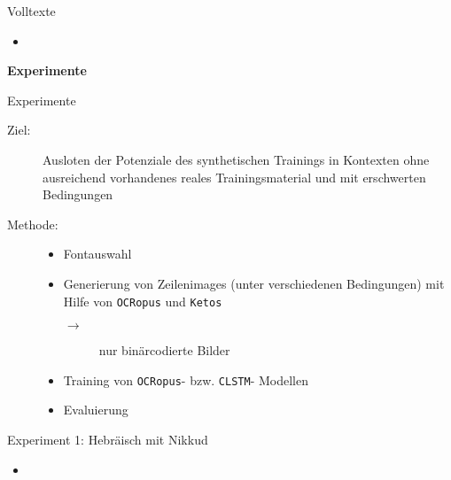 \documentclass{bbawslides}
\begin{document}
\begin{bbawslide}{Volltexte}
  \vspace*{7mm}%
  \centerslidestrue%
  \begin{itemize}
    \item
  \end{itemize}
\end{bbawslide}

\begin{bbawpart}{\Large\bf Experimente}
\end{bbawpart}

\begin{bbawslide}{Experimente}
  \vspace*{7mm}%
  \centerslidestrue%
  \begin{description}
    \item[Ziel:] Ausloten der Potenziale des synthetischen Trainings in Kontexten ohne ausreichend vorhandenes reales Trainingsmaterial und mit erschwerten Bedingungen
    \item[Methode:]
      \begin{itemize}
        \item Fontauswahl
        \item Generierung von Zeilenimages (unter verschiedenen Bedingungen) mit Hilfe von \texttt{OCRopus} und \texttt{Ketos}
        \begin{description}
          \item[$\rightarrow$] nur binärcodierte Bilder
        \end{description}
        \item Training von \texttt{OCRopus}- bzw. \texttt{CLSTM}- Modellen
        \item Evaluierung
      \end{itemize}
  \end{description}
\end{bbawslide}

\begin{bbawslide}{Experiment 1: Hebräisch mit Nikkud}
  \vspace*{7mm}%
  \centerslidestrue%
  \begin{itemize}
    \item 
  \end{itemize}
\end{bbawslide}
\end{document}
